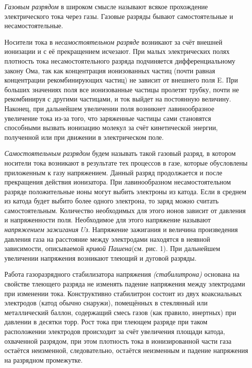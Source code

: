 \documentclass[a4paper]{article}
\begin{document}
\textit{Газовым разрядом} в широком смысле называют всякое прохождение электрического тока
через газы. Газовые разряды бывают самостоятельные и несамостоятельные. \par 
Носители тока в \textit{несамостоятельном разряде} возникают за счёт внешней ионизации и с её
прекращением исчезают. При малых электрических полях плотность тока несамостоятельного разряда подчиняется дифференциальному закону Ома, так как концентрация ионизованных частиц (почти равная концентрации рекомбинирующих частиц) не зависит от внешнего поля E. При больших значениях поля все ионизованные частицы пролетят трубку, почти
не рекомбинируя с другими частицами, и ток выйдет на постоянную величину. Наконец,
при дальнейшем увеличении поля возникнет лавинообразное увеличение тока из-за того,
что заряженные частицы сами становятся способными вызвать ионизацию молекул за счёт
кинетической энергии, полученной или при движении в электрическом поле. \par
\textit{Самостоятельным разрядом} будем называть такой газовый разряд, в котором носители
тока возникают в результате тех процессов в газе, которые обусловлены приложенным к газу напряжением. Данный разряд продолжается и после прекращения действия ионизатора.
При лавинообразном несамостоятельном разряде положительные ионы могут выбить электроны из катода. Если в среднем из катода будет выбито более одного электрона, то заряд
можно считать самостоятельным. Количество необходимых для этого ионов зависит от давления и напряженности поля. Необходимое для этого напряжение называют \textit{напряжением
зажигания $U$з}. Напряжение зажигания и величина произведения давления газа на расстояние между электродами находятся в неявной зависимости, описываемой \textit{кривой Пашена}(см. рис. 1). При дальнейшем увеличении напряжения возникают тлеющий и дуговой разряды. \par

Работа газоразрядного стабилизатора напряжения  \textit{(стабилитрона)} основана на свойстве тлеющего разряда не изменять падение напряжения между электродами при изменении тока. Конструктивно стабилитрон состоит из двух коаксиальных электродов (катод обычно снаружи), помещённых в стеклянный или металлический баллон, содержащий смесь газов (как правило, инертных) при давлении в десятки торр. Рост тока при тлеющем разряде при таком расположении электродов происходит за счёт увеличения площади катода, охваченной разрядом, при этом плотность тока в ионизированной части газа остаётся неизменной, следовательно, остаётся неизменным и падение напряжения на разрядном промежутке. 
\end{document}
